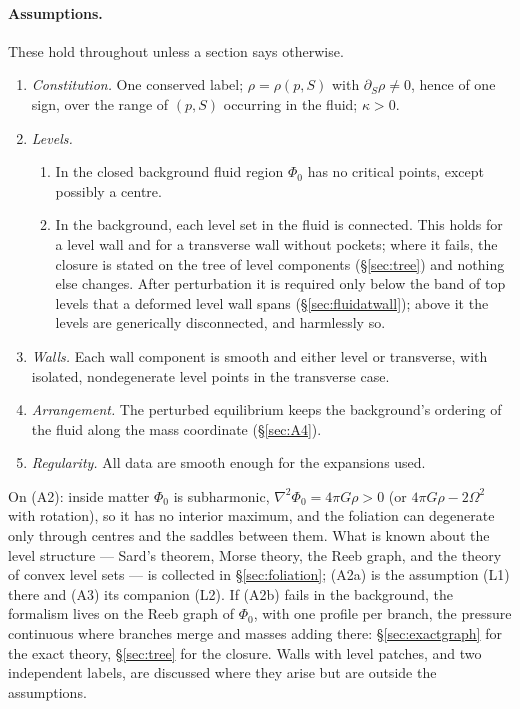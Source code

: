 \documentclass[11pt]{article}
\theoremstyle{definition}
\theoremstyle{remark}
\begin{document}
\paragraph{Assumptions.} These hold throughout unless a section says
otherwise.
\begin{enumerate}[label=(A\arabic*)]
\item \emph{Constitution.} One conserved label; $\rho = \rho(p, S)$
  with $\partial_S\rho \ne 0$, hence of one sign, over the range of
  $(p, S)$ occurring in the fluid; $\kappa > 0$.
\item \emph{Levels.}
  \begin{enumerate}[label=(\alph*)]
  \item In the closed background fluid region $\Phi_0$ has no
    critical points, except possibly a centre.
  \item In the background, each level set in the fluid is connected.
    This holds for a level wall and for a transverse wall without
    pockets; where it fails, the closure is stated on the tree of level
    components (\S\ref{sec:tree}) and nothing else changes. After
    perturbation it is required only below the band of top levels that
    a deformed level wall spans (\S\ref{sec:fluidatwall}); above it the
    levels are generically disconnected, and harmlessly so.
  \end{enumerate}
\item \emph{Walls.} Each wall component is smooth and either level or
  transverse, with isolated, nondegenerate level points in the
  transverse case.
\item \emph{Arrangement.} The perturbed equilibrium keeps the
  background's ordering of the fluid along the mass coordinate
  (\S\ref{sec:A4}).
\item \emph{Regularity.} All data are smooth enough for the expansions
  used.
\end{enumerate}
On (A2): inside matter $\Phi_0$ is subharmonic, $\nabla^2\Phi_0 = 4\pi
G\rho > 0$ (or $4\pi G\rho - 2\Omega^2$ with rotation), so it has no
interior maximum, and the foliation can degenerate only through
centres and the saddles between them. What is known about the level
structure --- Sard's theorem, Morse theory, the Reeb graph, and the
theory of convex level sets --- is collected in \S\ref{sec:foliation};
(A2a) is the assumption (L1) there and (A3) its companion (L2). If
(A2b) fails in the background, the formalism lives on the Reeb graph
of $\Phi_0$, with one profile per branch, the pressure continuous
where branches merge and masses adding there: \S\ref{sec:exactgraph}
for the exact theory, \S\ref{sec:tree} for the closure. Walls with
level patches, and two independent labels, are discussed where they
arise but are outside the assumptions.
\end{document}
